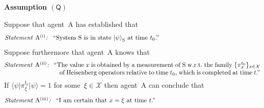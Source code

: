 \documentclass[12pt]{article}
\theoremstyle{mystyle}
\theoremstyle{definition}
\newcommand*{\cX}{\mathcal{X}}
\newcommand*{\ket}[1]{{| #1 \rangle}}
\newcommand*{\bra}[1]{{\langle #1 |}}
\newcommand*{\Agent}{\mathrm{A}}
\newcommand*{\System}{\mathrm{S}}
\newcommand*{\QT}{\mathsf{(Q)}}
\newcommand*{\asn}[1]{``#1''}
\newcommand*{\sT}[1]{{\text{\emph{Statement} $#1$\emph{:} }}}
\newcommand*{\sTM}[1]{\begin{minipage}{14cm} \hangindent=8.6em  #1 \end{minipage}}
\begin{document}
 \newcommand{\nsb}{\vspace{-1.4ex}}
 
\begin{emphbox}

  \noindent \textbf{Assumption $\QT$}   
  
   \smallskip
 
\noindent 
Suppose that agent~$\Agent$ has established that \nsb
\begin{align*}
\sTM{\sT{\Agent^{\mathrm{(i)}}} \asn{System $\System$ is in state $\ket{\psi}_{\System}$ at time~$t_0$.}} 
\end{align*}
 Suppose furthermore that agent~$\Agent$ knows that \nsb
\begin{align*}
\sTM{\sT{{\Agent}^{\mathrm{(ii)}}}  \asn{The value $x$ is obtained by a measurement of $\System$  w.r.t.\ the family $\{\pi^{t_0}_x\}_{x \in \cX}$ of Heisenberg operators relative to time $t_0$, which is completed at time~$t$.}}
\end{align*} 
If $\bra{\psi} \pi_{\xi}^{t_0} \ket{\psi} = 1$ for some~$\xi \in \cX$ then agent~$\Agent$ can conclude that \nsb
\begin{align*}
\sTM{\sT{{\Agent}^{\mathrm{(iii)}}} \asn{I am certain that $x=\xi$ at time $t$.}}
\end{align*} \vspace{-4ex}

\end{emphbox}
\end{document}

